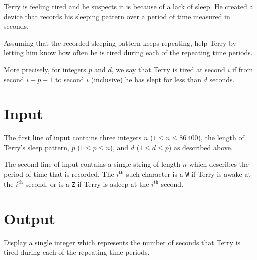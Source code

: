 
Terry is feeling tired and he suspects it is because of a lack of sleep. 
He created a device that records his sleeping pattern over a period of 
time measured in seconds.

Assuming that the recorded sleeping pattern keeps repeating,
help Terry by letting him know how often he is tired during each of the repeating time periods.

More precisely, for integers $p$ and $d$, we say that Terry is tired
at second $i$ if from second $i-p+1$ to second $i$ (inclusive) he has
slept for less than $d$ seconds.

\section*{Input}

The first line of input contains three integers $n$ ($1 \leq n \leq 
86\,400$), the length of Terry's sleep pattern, $p$ ($1 \leq p \leq n$), 
and $d$ ($1 \leq d \leq p$) as described above.

The second line of input contains a single string of length $n$ which 
describes the period of time that is recorded. The $i^\textrm{th}$ such 
character is a \texttt{W} if Terry is awake at the $i^\textrm{th}$ second, or is 
a \texttt{Z} if Terry is asleep at the $i^\textrm{th}$ second.

\section*{Output}

Display a single integer which represents the number of seconds that Terry 
is tired during each of the repeating time periods.

